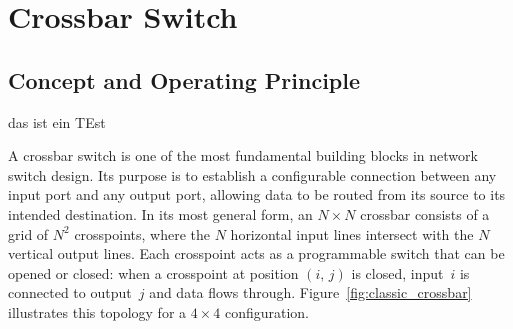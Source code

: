 
\section{Crossbar Switch}
\label{sec:crossbar}

\subsection{Concept and Operating Principle}
\label{subsec:crossbar_concept}

das ist ein TEst

A crossbar switch is one of the most fundamental building blocks in network switch design.
Its purpose is to establish a configurable connection between any input port and any output port, 
allowing data to be routed from its source to its intended destination.
In its most general form, an $N \times N$ crossbar consists of a grid of $N^2$ crosspoints, 
where the $N$ horizontal input lines intersect with the $N$ vertical output lines.
Each crosspoint acts as a programmable switch that can be opened or closed: 
when a crosspoint at position $(i,\,j)$ is closed, input~$i$ is connected to output~$j$ 
and data flows through.
Figure~\ref{fig:classic_crossbar} illustrates this topology for a $4 \times 4$ configuration.

